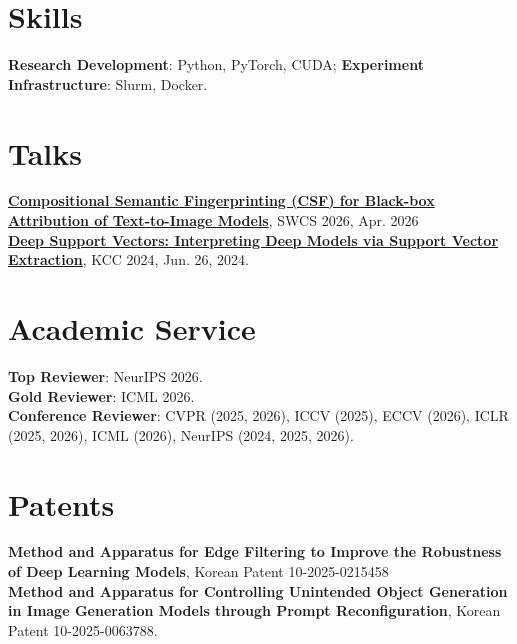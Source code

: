 \documentclass[10pt, letterpaper]{article}
\begin{document}
\section{Skills}
{\small
\textbf{Research Development}: Python, PyTorch, CUDA; \textbf{Experiment Infrastructure}: Slurm, Docker.
}

\section{Talks}
{\small
\textbf{\href{https://junhoo.me/csf}{Compositional Semantic Fingerprinting (CSF) for Black-box Attribution of Text-to-Image Models}}, SWCS 2026, Apr. 2026\\
\textbf{\href{https://arxiv.org/abs/2403.17329}{Deep Support Vectors: Interpreting Deep Models via Support Vector Extraction}}, KCC 2024, Jun. 26, 2024.
}

\section{Academic Service}
{\small
\textbf{Top Reviewer}: NeurIPS 2026.\\
\textbf{Gold Reviewer}: ICML 2026.\\
\textbf{Conference Reviewer}: CVPR (2025, 2026), ICCV (2025), ECCV (2026), ICLR (2025, 2026), ICML (2026), NeurIPS (2024, 2025, 2026).
}

\section{Patents}
{\small
\textbf{Method and Apparatus for Edge Filtering to Improve the Robustness of Deep Learning Models}, Korean Patent 10-2025-0215458\\
\textbf{Method and Apparatus for Controlling Unintended Object Generation in Image Generation Models through Prompt Reconfiguration}, Korean Patent 10-2025-0063788.
}
\end{document}
